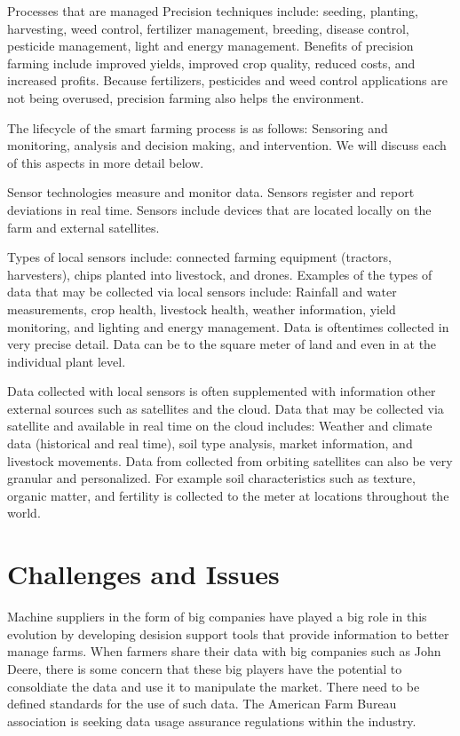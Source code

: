 \documentclass[sigconf]{acmart}
\begin{document}
Processes that are managed Precision techniques include: seeding, planting, harvesting, weed control, fertilizer management, breeding, disease control, pesticide management, light and energy management. Benefits of precision farming include improved yields, improved crop quality, reduced costs, and increased profits.  Because fertilizers, pesticides and weed control applications are not being overused, precision farming also helps the environment. 


The lifecycle of the smart farming process is as follows: Sensoring and monitoring, analysis and decision making, and intervention.  We will discuss each of this aspects in more detail below.

Sensor technologies measure and monitor data.  Sensors register and report deviations in real time. Sensors include devices that are located locally on the farm and external satellites. 

Types of local sensors include: connected farming equipment (tractors, harvesters), chips planted into livestock, and drones. Examples of the types of data that may be collected via local sensors include: Rainfall and water measurements, crop health, livestock health, weather information, yield monitoring, and lighting and energy management. Data is oftentimes collected in very precise detail. Data can be to the square meter of land and even in at the individual plant level. 

Data collected with local sensors is often supplemented with information other external sources such as satellites and the cloud. Data that may be collected via satellite and available in real time on the cloud includes: Weather and climate data (historical and real time), soil type analysis, market information, and livestock movements. Data from collected from orbiting satellites can also be very granular and personalized. For example soil characteristics such as texture, organic matter, and fertility is collected to the meter at locations throughout the world. 

\section{Challenges and Issues}

Machine suppliers in the form of big companies have played a big role in this evolution by developing desision support tools that provide information to better manage farms. When farmers share their data with big companies such as John Deere, there is some concern that these big players have the potential to consoldiate the data and use it to manipulate the market. There need to be defined standards for the use of such data. The American Farm Bureau association is seeking data usage assurance regulations within the industry.
\end{document}
